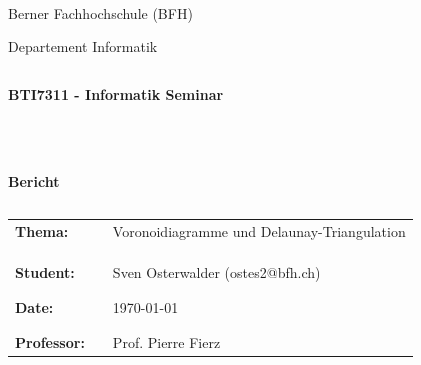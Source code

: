 \thispagestyle{empty}
\begin{center}
\\
\end{center}
\begin{center}
\Large{Berner Fachhochschule (BFH)}\\
\end{center}
 
 
\begin{center}
\Large{Departement Informatik}
\end{center}
\begin{verbatim}
\end{verbatim}
\begin{center}
\textbf{\LARGE{BTI7311 - Informatik Seminar}}
\end{center}
\begin{verbatim}
 
 
\end{verbatim}
\begin{center}
\textbf{Bericht}
\end{center}
\begin{verbatim} 
\end{verbatim}
 
\begin{flushleft}
\begin{tabular}{lll}
\textbf{Thema:} & & Voronoidiagramme und Delaunay-Triangulation\\
& & \\
& & \\
& & \\
\textbf{Student:} & & Sven Osterwalder (ostes2@bfh.ch)\\
& & \\
& & \\
\textbf{Date:} & & {\today}\\
& & \\
& & \\
\textbf{Professor:} & & Prof. Pierre Fierz
\end{tabular}
\end{flushleft}